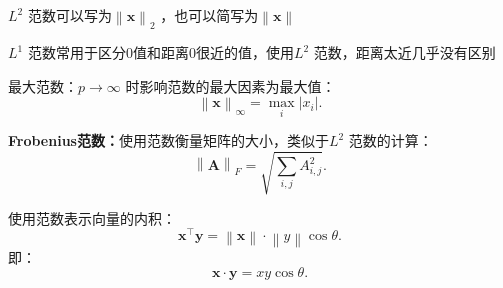 \begin{notation}
    $L^2 $ 范数可以写为$\left\lVert \bm{x} \right\rVert _2$ ，也可以简写为$\left\lVert \bm{x} \right\rVert$
\end{notation}
\begin{notation}
    $L^{1}$ 范数常用于区分0值和距离0很近的值，使用$L^{2}$ 范数，距离太近几乎没有区别
\end{notation}
\begin{defi}
    最大范数：$p\to \infty $ 时影响范数的最大因素为最大值：\[
        \left\lVert \bm{x} \right\rVert_\infty = \max_{i}\left| x_{i} \right|
    .\]
\end{defi}
\begin{eg}
    \textbf{Frobenius范数：}使用范数衡量矩阵的大小，类似于$L^2 $ 范数的计算：
    \[
        \left\lVert \bm{A} \right\rVert_F = \sqrt{\sum_{i,j}^{} A_{i,j}^2 }
    .\]
\end{eg}
\begin{eg}
    使用范数表示向量的内积：\[
        \bm{x}^\top \bm{y}=\left\lVert \bm{x} \right\rVert\cdot \left\lVert y \right\rVert\cos\theta
    .\]
    即：\[
        \bm{x}\cdot \bm{y}=xy\cos\theta
    .\]
\end{eg}
